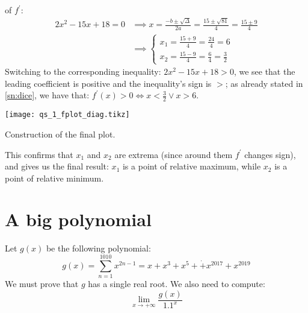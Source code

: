 of $f^\prime$:
\begin{equation*}
    \begin{split}
        2x^2 - 15x + 18 = 0 &\implies x = \frac{-b \pm \sqrt{\Delta}}{2a} =
        \frac{15 \pm \sqrt{81}}{4} = \frac{15 \pm 9}{4}\\
        &\implies
        \begin{cases}
            x_1 = \frac{15 + 9}{4} = \frac{24}{4} = 6\\
            x_2 = \frac{15 - 9}{4} = \frac{6}{4} = \frac{3}{2}
        \end{cases}
    \end{split}
\end{equation*}
Switching to the corresponding inequality: $2x^2 - 15x + 18 > 0$, we see that
the leading coefficient is positive and the inequality's sign is $>$; as
already stated in \ref{sn:dice}, we have
that: $f^\prime(x) > 0 \iff x < \frac{3}{2} \vee x > 6$.
%
\begin{marginfigure}[-5.3\textwidth]
    \texttt{[image: qs\_1\_fplot\_diag.tikz]}
    \caption{Construction of the final plot.}%
    \label{fig:pr1fplot}%
\end{marginfigure}
%
This confirms that $x_1$ and $x_2$ are extrema (since around them $f^\prime$ changes sign),
and gives us the final result: $x_1$ is a point of relative maximum, while $x_2$ is
a point of relative minimum.

\section{A big polynomial}
\label{sec:bigpoly}
Let $g(x)$ be the following polynomial:
\begin{equation*}
    g(x) = \sum_{n = 1}^{1010} x^{2n-1} = x + x^3 + x^5 + \dot + x^{2017} + x^{2019}
\end{equation*}
We must prove that $g$ has a single real root. We also need to compute:
\begin{equation}\label{eq:limfracpolyexp}
    \lim_{x \to +\infty} \frac{g(x)}{1.1^x}
\end{equation}

